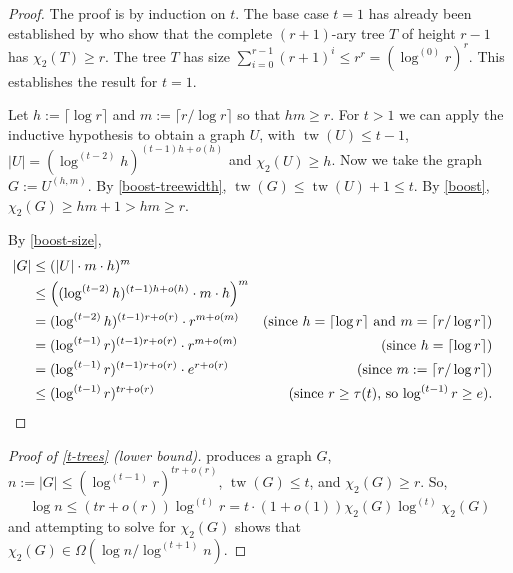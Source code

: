 \documentclass[kpfonts]{patmorin}
\DeclareMathOperator{\tw}{tw}
\newcommand{\trn}{\chi_2}
\theoremstyle{named}
\begin{document}
\begin{proof}
    The proof is by induction on $t$.  The base case $t=1$ has already been established by \citet{karpas.neiman.ea:on} who show that the complete $(r+1)$-ary tree $T$ of height $r-1$ has $\trn(T)\ge r$.  The tree $T$ has size $\sum_{i=0}^{r-1} (r+1)^i \le r^r=(\log^{(0)}r)^{r}$.  This establishes the result for $t=1$.

    Let $h:=\lceil\log r\rceil$ and $m:=\lceil r/\log r\rceil$ so that $hm\ge r$.  For $t>1$ we can apply the inductive hypothesis to obtain a graph $U$, with $\tw(U)\le t-1$, $|U|=(\log^{(t-2)} h)^{(t-1)h+o(h)}$ and $\trn(U)\ge h$.
    Now we take the graph $G:=U^{(h,m)}$.  By \cref{boost-treewidth}, $\tw(G)\le \tw(U)+1\le t$.  By \cref{boost},
    $\trn(G)\ge hm+1 > hm \ge r$.

    By \cref{boost-size},
    \begin{align*}
        |G| & \le (|U|\cdot m\cdot h)^{m} \\
        & \le \left((\log^{(t-2)} h)^{(t-1)h + o(h)}\cdot m\cdot h\right)^{m} \\
        & = (\log^{(t-2)} h)^{(t-1)r + o(r)}\cdot r^{m+o(m)}
        & \text{(since $h=\lceil\log r\rceil$ and $m=\lceil r/\log r\rceil$)}\\
        & = (\log^{(t-1)} r)^{(t-1)r + o(r)}\cdot r^{m+o(m)}
         & \text{(since $h=\lceil\log r\rceil$)} \\
        & = (\log^{(t-1)} r)^{(t-1)r + o(r)}\cdot e^{r+o(r)}
        & \text{(since $m:=\lceil r/\log r\rceil$)}\\
        & \le (\log^{(t-1)} r)^{tr + o(r)} & \text{(since $r\ge \tau(t)$, so $\log^{(t-1)} r\ge e$).} & \qedhere
    \end{align*}
\end{proof}

\begin{proof}[Proof of \cref{t-trees} (lower bound)]
     produces a graph $G$, $n:=|G|\le (\log^{(t-1)} r)^{tr+o(r)}$, $\tw(G)\le t$, and $\trn(G)\ge r$.  So,
    \[
        \log n \le (tr+o(r))\log^{(t)} r
        = t\cdot(1+o(1))\trn(G)\log^{(t)} \trn(G)
    \]
    and attempting to solve for $\trn(G)$ shows that $\trn(G)\in \Omega(\log n/\log^{(t+1)} n)$.
\end{proof}
\end{document}
